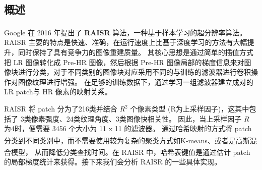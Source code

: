\documentclass[12pt, a4paper, oneside]{ctexbook}
\begin{document}
	\subsection{概述}
	Google 在 2016 年提出了 \textbf{RAISR}\textsuperscript{\cite{1}} 算法，一种基于样本学习的超分辨率算法。
	RAISR 主要的特点是快速、准确，在运行速度上比基于深度学习的方法有大幅提升，同时保持了具有竞争力的图像重建质量。
	其核心思想是通过简单的插值方式把 LR 图像转化成 Pre-HR 图像，然后根据 Pre-HR 图像局部的梯度信息来对图像块进行分类，对于不同类别的图像块对应采用不同的与训练的滤波器进行卷积操作对图像纹理进行增强。
	在足够的训练数据下，通过学习一组滤波器建立成对的 LR patch与 HR 像素的映射关系。
	\par RAISR 将 patch 分为了216类并结合 $R^2$ 个像素类型 (R为上采样因子)，这其中包括了 3类像素强度、24类纹理角度、3类图像快相关性。
	因此，当上采样因子 $R$ 为4时，便需要 3456 个大小为 11 x 11 的滤波器。
	通过哈希映射的方式将 patch 分类到不同类别中，而不需要使用较为复杂的聚类方式如K-means\textsuperscript{\cite{2}}、或者是高斯混合模型\textsuperscript{\cite{3}}，
	从而降低分类查找时间。在 RAISR 中，哈希表键值是通过估计 patch 的局部梯度统计来获得。接下来我们会分析 RAISR 的一些具体实现。
\end{document}
